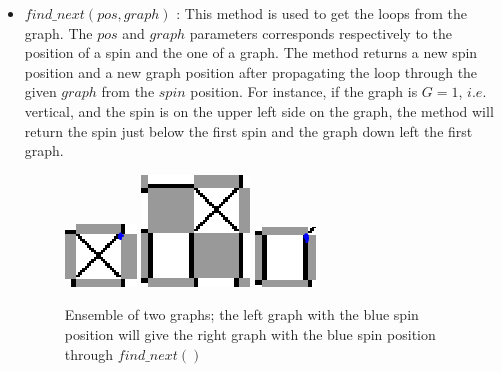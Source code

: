 \documentclass[a4paper,12pt]{article}
\begin{document}
\begin{itemize}[label=$\star$]
\begin{figure}[H]
			\label{tileandgraph}
		\end{figure}
		\item $find\_next(pos, graph)$ : This method is used to get the loops from the graph. The $pos$ and $graph$ parameters corresponds respectively to the position of a spin and the one of a graph. The method returns a new spin position and a new graph position after propagating the loop through the given $graph$ from the $spin$ position. For instance, if the graph is $G = 1$, $i.e.$ vertical, and the spin is on the upper left side on the graph, the method will return the spin just below the first spin and the graph down left the first graph. 
		\begin{figure}[H]
			\centering
			\includegraphics[]{firstgraph.png}
			\includegraphics[]{twograph.png}
			\includegraphics[]{secondgraph.png}
			\caption{Ensemble of two graphs; the left graph with the blue spin position will give the right graph with the blue spin position through $find\_next()$}
			

\end{figure}
\end{itemize}
\end{document}
